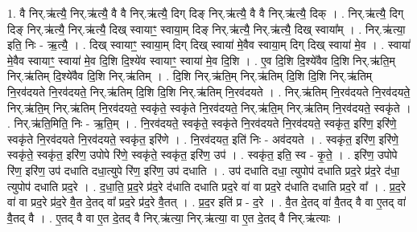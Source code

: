 \documentclass[17pt]{extarticle}
\begin{document}
1. वै निर्.ऋ॑त्यै॒ निर्.ऋ॑त्यै॒ वै वै निर्.ऋ॑त्यै॒ दिग् दिङ् निर्.ऋ॑त्यै॒ वै वै निर्.ऋ॑त्यै॒ दिक् । . निर्.ऋ॑त्यै॒ दिग् दिङ् निर्.ऋ॑त्यै॒ निर्.ऋ॑त्यै॒ दिख् स्वायाꣳ॒॒ स्वाया॒म् दिङ् निर्.ऋ॑त्यै॒ निर्.ऋ॑त्यै॒ दिख् स्वाया᳚म् । . निर्.ऋ॑त्या॒ इति॒ निः - ऋ॒त्यै॒ । . दिख् स्वायाꣳ॒॒ स्वाया॒म् दिग् दिख् स्वाया॑ मे॒वैव स्वाया॒म् दिग् दिख् स्वाया॑ मे॒व । . स्वाया॑ मे॒वैव स्वायाꣳ॒॒ स्वाया॑ मे॒व दि॒शि दि॒श्ये॑व स्वायाꣳ॒॒ स्वाया॑ मे॒व दि॒शि । . ए॒व दि॒शि दि॒श्ये॑वैव दि॒शि निर्.ऋ॑ति॒म् निर्.ऋ॑तिम् दि॒श्ये॑वैव दि॒शि निर्.ऋ॑तिम् । . दि॒शि निर्.ऋ॑ति॒म् निर्.ऋ॑तिम् दि॒शि दि॒शि निर्.ऋ॑तिम् नि॒रव॑दयते नि॒रव॑दयते॒ निर्.ऋ॑तिम् दि॒शि दि॒शि निर्.ऋ॑तिम् नि॒रव॑दयते । . निर्.ऋ॑तिम् नि॒रव॑दयते नि॒रव॑दयते॒ निर्.ऋ॑ति॒म् निर्.ऋ॑तिम् नि॒रव॑दयते॒ स्वकृ॑ते॒ स्वकृ॑ते नि॒रव॑दयते॒ निर्.ऋ॑ति॒म् निर्.ऋ॑तिम् नि॒रव॑दयते॒ स्वकृ॑ते । . निर्.ऋ॑ति॒मिति॒ निः - ऋ॒ति॒म् । . नि॒रव॑दयते॒ स्वकृ॑ते॒ स्वकृ॑ते नि॒रव॑दयते नि॒रव॑दयते॒ स्वकृ॑त॒ इरि॑ण॒ इरि॑णे॒ स्वकृ॑ते नि॒रव॑दयते नि॒रव॑दयते॒ स्वकृ॑त॒ इरि॑णे । . नि॒रव॑दयत॒ इति॑ निः - अव॑दयते । . स्वकृ॑त॒ इरि॑ण॒ इरि॑णे॒ स्वकृ॑ते॒ स्वकृ॑त॒ इरि॑ण॒ उपोपे रि॑णे॒ स्वकृ॑ते॒ स्वकृ॑त॒ इरि॑ण॒ उप॑ । . स्वकृ॑त॒ इति॒ स्व - कृ॒ते॒ । . इरि॑ण॒ उपोपे रि॑ण॒ इरि॑ण॒ उप॑ दधाति दधा॒त्युपे रि॑ण॒ इरि॑ण॒ उप॑ दधाति । . उप॑ दधाति दधा॒ त्युपोप॑ दधाति प्रद॒रे प्र॑द॒रे द॑धा॒ त्युपोप॑ दधाति प्रद॒रे । . द॒धा॒ति॒ प्र॒द॒रे प्र॑द॒रे द॑धाति दधाति प्रद॒रे वा॑ वा प्रद॒रे द॑धाति दधाति प्रद॒रे वा᳚ । . प्र॒द॒रे वा॑ वा प्रद॒रे प्र॑द॒रे वै॒त दे॒तद् वा᳚ प्रद॒रे प्र॑द॒रे वै॒तत् । . प्र॒द॒र इति॑ प्र - द॒रे । . वै॒त दे॒तद् वा॑ वै॒तद् वै वा ए॒तद् वा॑ वै॒तद् वै । . ए॒तद् वै वा ए॒त दे॒तद् वै निर्.ऋ॑त्या॒ निर्.ऋ॑त्या॒ वा ए॒त दे॒तद् वै निर्.ऋ॑त्याः । \newline
\end{document}
